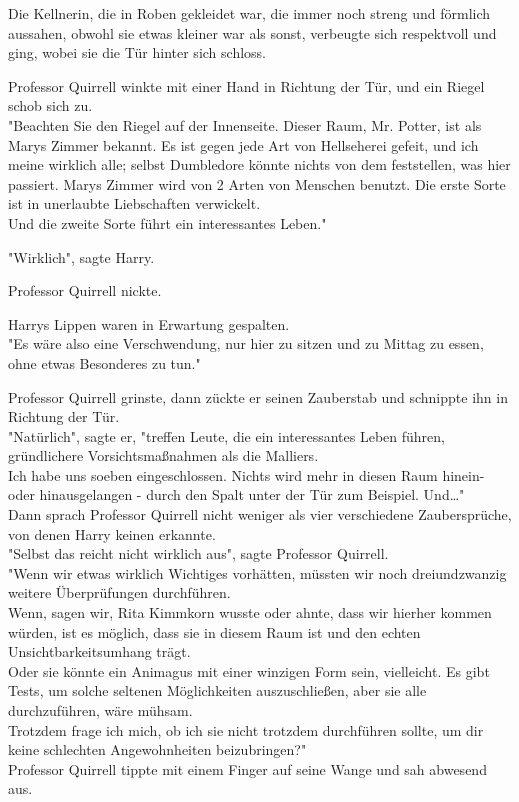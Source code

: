 {Die Kellnerin, die in Roben gekleidet war, die immer noch streng und förmlich aussahen, obwohl sie etwas kleiner war als sonst, verbeugte sich respektvoll und ging, wobei sie die Tür hinter sich schloss.

Professor Quirrell winkte mit einer Hand in Richtung der Tür, und ein Riegel schob sich zu.\\ "Beachten Sie den Riegel auf der Innenseite. Dieser Raum, Mr. Potter, ist als Marys Zimmer bekannt. Es ist gegen jede Art von Hellseherei gefeit, und ich meine wirklich alle; selbst Dumbledore könnte nichts von dem feststellen, was hier passiert. Marys Zimmer wird von 2 Arten von Menschen benutzt. Die erste Sorte ist in unerlaubte Liebschaften verwickelt.\\ Und die zweite Sorte führt ein interessantes Leben."

"Wirklich", sagte Harry.

Professor Quirrell nickte.

Harrys Lippen waren in Erwartung gespalten.\\ "Es wäre also eine Verschwendung, nur hier zu sitzen und zu Mittag zu essen, ohne etwas Besonderes zu tun."

Professor Quirrell grinste, dann zückte er seinen Zauberstab und schnippte ihn in Richtung der Tür.\\ "Natürlich", sagte er, "treffen Leute, die ein interessantes Leben führen, gründlichere Vorsichtsmaßnahmen als die Malliers.\\ Ich habe uns soeben eingeschlossen. Nichts wird mehr in diesen Raum hinein- oder hinausgelangen - durch den Spalt unter der Tür zum Beispiel. Und…"\\ Dann sprach Professor Quirrell nicht weniger als vier verschiedene Zaubersprüche, von denen Harry keinen erkannte.\\ "Selbst das reicht nicht wirklich aus", sagte Professor Quirrell.\\ "Wenn wir etwas wirklich Wichtiges vorhätten, müssten wir noch dreiundzwanzig weitere Überprüfungen durchführen.\\ Wenn, sagen wir, Rita Kimmkorn wusste oder ahnte, dass wir hierher kommen würden, ist es möglich, dass sie in diesem Raum ist und den echten Unsichtbarkeitsumhang trägt.\\ Oder sie könnte ein Animagus mit einer winzigen Form sein, vielleicht. Es gibt Tests, um solche seltenen Möglichkeiten auszuschließen, aber sie alle durchzuführen, wäre mühsam.\\ Trotzdem frage ich mich, ob ich sie nicht trotzdem durchführen sollte, um dir keine schlechten Angewohnheiten beizubringen?"\\ Professor Quirrell tippte mit einem Finger auf seine Wange und sah abwesend aus.

}
